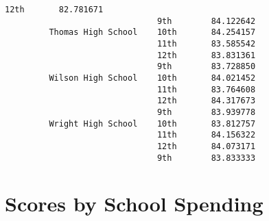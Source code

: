 \documentclass[11pt]{article}
\begin{document}
\begin{Verbatim}[commandchars=\\\{\}]
                               12th       82.781671
                               9th        84.122642
         Thomas High School    10th       84.254157
                               11th       83.585542
                               12th       83.831361
                               9th        83.728850
         Wilson High School    10th       84.021452
                               11th       83.764608
                               12th       84.317673
                               9th        83.939778
         Wright High School    10th       83.812757
                               11th       84.156322
                               12th       84.073171
                               9th        83.833333
\end{Verbatim}
            
    \section{Scores by School Spending}\label{scores-by-school-spending}
\end{document}
